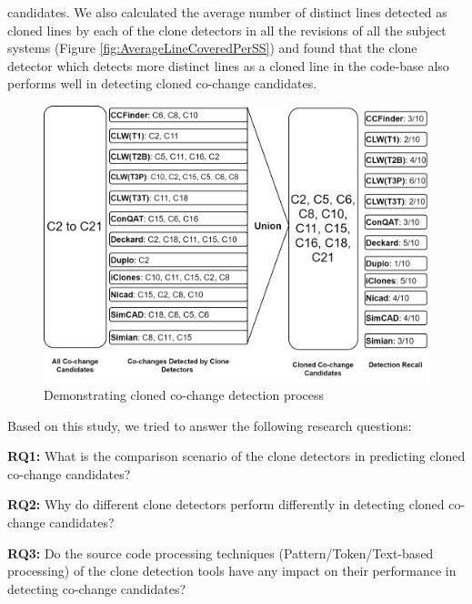 \documentclass[review]{elsarticle}
\begin{document}
candidates.  We also calculated the average number of distinct lines detected as cloned lines by each of the clone detectors in all the revisions of all the subject systems (Figure \ref{fig:AverageLineCoveredPerSS}) and found that the clone detector which detects more distinct lines as a cloned line in the code-base also performs well in detecting cloned co-change candidates.


\vspace{4mm}
\begin{figure}
\centering
\includegraphics[width=\columnwidth] {CalculatingCC.png}
\caption{Demonstrating cloned co-change detection process}
\label{fig:CalculatingCC}
\end{figure}

Based on this study, we tried to answer the following research questions:

\vspace{0.15cm}
\noindent
\textbf{RQ1: }What is the comparison scenario of the clone detectors in predicting cloned co-change candidates?
 
\vspace{0.15cm}
\noindent
\textbf{RQ2: }Why do different clone detectors perform differently in detecting cloned co-change candidates?

\vspace{0.15cm}
\noindent
\textbf{RQ3: }Do the source code processing techniques (Pattern/Token/Text-based processing) of the clone detection tools have any impact on their performance in detecting co-change candidates?
\end{document}
